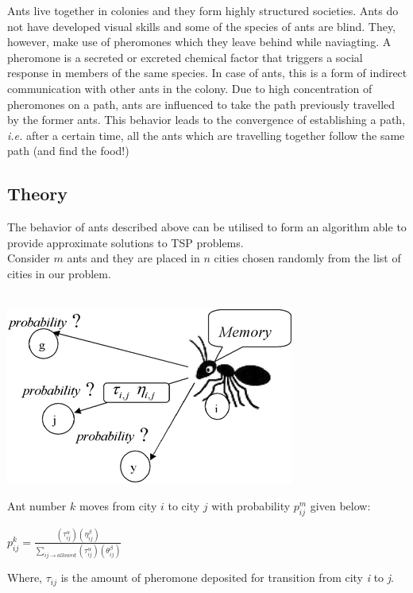 \documentclass[11pt, english]{article}
\begin{document}
Ants live together in colonies and they form highly structured societies. Ants do not have developed visual skills and some of the species of ants are blind. They, however, make use of pheromones which they leave behind while naviagting. A pheromone is a secreted or excreted chemical factor that triggers a social response in members of the same species. In case of ants, this is a form of indirect communication with other ants in the colony. Due to high concentration of pheromones on a path, ants are influenced to take the path previously travelled by the former ants. This behavior leads to the convergence of establishing a path, \emph{i.e.} after a certain time, all the ants which are travelling together follow the same path (and find the food!)
 
\subsection{Theory}

The behavior of ants described above can be utilised to form an algorithm able to provide approximate solutions to TSP problems.\\

\noindent
Consider $m$ ants and they are placed in $n$ cities chosen randomly from the list of cities in our problem.\\
\\
\begin{center}
\includegraphics[scale=0.5]{ant.png}
\end{center}

\noindent
Ant number $k$ moves from city $i$ to city $j$ with probability $p_{ij}^m$ given below:

\begin{center}
$p_{ij}^k = \frac{{(\tau_{ij}^\alpha)(\eta_{ij}^\beta)}}{\sum_{ij \rightarrow allowed}{(\tau_{ij}^\alpha)(\theta_{ij}^\beta)}}$
\end{center}
\noindent
Where, $\tau_{ij}$ is the amount of pheromone deposited for transition from city \emph{i} to \emph{j}.
\end{document}
